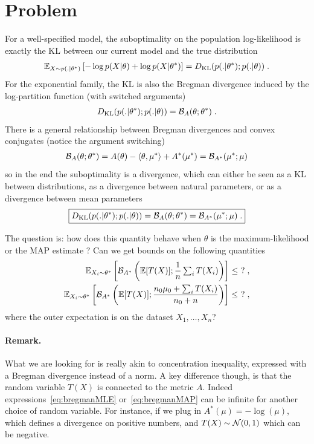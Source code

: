 \documentclass{article}
\newenvironment{important}{
	\begin{mdframed}[backgroundcolor=myblue, roundcorner=5pt]
}{		
	\end{mdframed}
}
\newcommand*{\expect}[2][]{\ensuremath{\mathbb{E}_{#1} \left[ #2 \right] }} %
\newcommand{\logpart}{A}
\newcommand{\conj}{\logpart^*}
\newcommand{\bregman}{\cB_\logpart}
\newcommand{\bregmanconj}{\cB_{\logpart^*}}
\newcommand{\natp}{\theta}
\newcommand{\meanp}{\mu}
\begin{document}
\section{Problem}
For a well-specified model, the suboptimality on the population log-likelihood is exactly the KL between our current model and the true distribution
\begin{align}
    \expect[X\sim p(.|\natp^*)]{-\log p(X|\natp) + \log p(X|\natp^*) }
	= \KL( p(.|\natp^*) ; p(.|\natp)) \; .
\end{align}
For the exponential family, the KL is also the Bregman divergence induced by the log-partition function (with switched arguments)
\begin{align}
	\KL( p(.|\natp^*) ; p(.|\natp)) 
	= \bregman (\natp ; \natp^*)  \; .
\end{align}
There is a general relationship between Bregman divergences and convex conjugates (notice the argument switching)
\begin{align}
	\bregman (\natp ; \natp^*)
    = \logpart(\natp) - \langle \natp , \mu^* \rangle + \conj(\mu^*)
    = \bregmanconj ( \meanp^* ; \meanp)
\end{align}
so in the end the suboptimality is a divergence, which can either be seen as a KL between distributions, as a divergence between natural parameters, or as a divergence between mean parameters
\begin{align}
\boxed{
	\KL( p(.|\natp^*) ; p(.|\natp))
    = \bregman (\natp ; \natp^*)
    = \bregmanconj ( \meanp^* ; \meanp) \; .
}
\end{align}
\begin{important}
The question is: how does this quantity behave when $\natp$ is the maximum-likelihood or the MAP estimate ? Can we get bounds on the following quantities
\begin{align}
	\label{eq:bregmanMLE}
	\expect[X_i\sim \natp^*]{\bregmanconj \left (\E [T(X)] ;  \inv{n}  \smallsum_i T(X_i) \right )} \leq \ ? \; , \\
	\label{eq:bregmanMAP}
	\expect[X_i\sim \natp^*]{\bregmanconj \left (\E [T(X)] ; \frac{n_0 \mu_0 + \smallsum_i T(X_i)}{n_0+n} \right )} \leq \ ? \; ,
\end{align}
where the outer expectation is on the dataset $X_1, \dots, X_n$?
\end{important}

\paragraph{Remark.}
What we are looking for is really akin to concentration inequality, expressed with a Bregman divergence instead of a norm. A key difference though, is that the random variable $T(X)$ is connected to the metric $\logpart$. Indeed expressions~\eqref{eq:bregmanMLE} or~\eqref{eq:bregmanMAP} can be infinite for another choice of random variable. For instance, if we plug in $\conj(\mu)= -\log(\mu)$, which defines a divergence on positive numbers, and $T(X) \sim {\mathcal N}(0,1)$ which can be negative.
\end{document}
